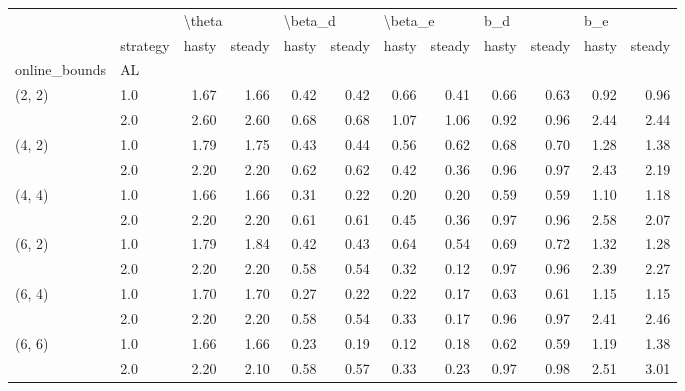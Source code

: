 \begin{tabular}{llrrrrrrrrrr}
\toprule
       & {} & \multicolumn{2}{l}{\textbackslash theta} & \multicolumn{2}{l}{\textbackslash beta\_d} & \multicolumn{2}{l}{\textbackslash beta\_e} & \multicolumn{2}{l}{b\_d} & \multicolumn{2}{l}{b\_e} \\
       & strategy &  hasty & steady &   hasty & steady &   hasty & steady & hasty & steady & hasty & steady \\
online\_bounds & AL &        &        &         &        &         &        &       &        &       &        \\
\midrule
(2, 2) & 1.0 &   1.67 &   1.66 &    0.42 &   0.42 &    0.66 &   0.41 &  0.66 &   0.63 &  0.92 &   0.96 \\
       & 2.0 &   2.60 &   2.60 &    0.68 &   0.68 &    1.07 &   1.06 &  0.92 &   0.96 &  2.44 &   2.44 \\
(4, 2) & 1.0 &   1.79 &   1.75 &    0.43 &   0.44 &    0.56 &   0.62 &  0.68 &   0.70 &  1.28 &   1.38 \\
       & 2.0 &   2.20 &   2.20 &    0.62 &   0.62 &    0.42 &   0.36 &  0.96 &   0.97 &  2.43 &   2.19 \\
(4, 4) & 1.0 &   1.66 &   1.66 &    0.31 &   0.22 &    0.20 &   0.20 &  0.59 &   0.59 &  1.10 &   1.18 \\
       & 2.0 &   2.20 &   2.20 &    0.61 &   0.61 &    0.45 &   0.36 &  0.97 &   0.96 &  2.58 &   2.07 \\
(6, 2) & 1.0 &   1.79 &   1.84 &    0.42 &   0.43 &    0.64 &   0.54 &  0.69 &   0.72 &  1.32 &   1.28 \\
       & 2.0 &   2.20 &   2.20 &    0.58 &   0.54 &    0.32 &   0.12 &  0.97 &   0.96 &  2.39 &   2.27 \\
(6, 4) & 1.0 &   1.70 &   1.70 &    0.27 &   0.22 &    0.22 &   0.17 &  0.63 &   0.61 &  1.15 &   1.15 \\
       & 2.0 &   2.20 &   2.20 &    0.58 &   0.54 &    0.33 &   0.17 &  0.96 &   0.97 &  2.41 &   2.46 \\
(6, 6) & 1.0 &   1.66 &   1.66 &    0.23 &   0.19 &    0.12 &   0.18 &  0.62 &   0.59 &  1.19 &   1.38 \\
       & 2.0 &   2.20 &   2.10 &    0.58 &   0.57 &    0.33 &   0.23 &  0.97 &   0.98 &  2.51 &   3.01 \\
\bottomrule
\end{tabular}
